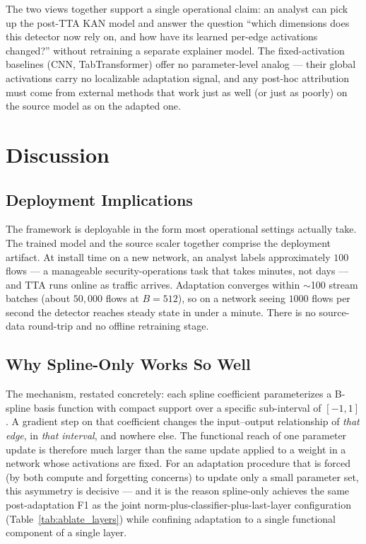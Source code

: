 \documentclass[10pt, conference, letterpaper]{IEEEtran}
\begin{document}
The two views together support a single operational claim: an analyst can pick up the post-TTA KAN model and answer the question ``which dimensions does this detector now rely on, and how have its learned per-edge activations changed?'' without retraining a separate explainer model. The fixed-activation baselines (CNN, TabTransformer) offer no parameter-level analog --- their global activations carry no localizable adaptation signal, and any post-hoc attribution must come from external methods that work just as well (or just as poorly) on the source model as on the adapted one.


\section{Discussion}
\label{sec:discussion}

\subsection{Deployment Implications}

The framework is deployable in the form most operational settings actually take. The trained model and the source scaler together comprise the deployment artifact. At install time on a new network, an analyst labels approximately $100$ flows --- a manageable security-operations task that takes minutes, not days --- and TTA runs online as traffic arrives. Adaptation converges within $\sim$100 stream batches (about $50{,}000$ flows at $B = 512$), so on a network seeing $1000$ flows per second the detector reaches steady state in under a minute. There is no source-data round-trip and no offline retraining stage.

\subsection{Why Spline-Only Works So Well}

The mechanism, restated concretely: each spline coefficient parameterizes a B-spline basis function with compact support over a specific sub-interval of $[-1, 1]$. A gradient step on that coefficient changes the input--output relationship of \emph{that edge}, in \emph{that interval}, and nowhere else. The functional reach of one parameter update is therefore much larger than the same update applied to a weight in a network whose activations are fixed. For an adaptation procedure that is forced (by both compute and forgetting concerns) to update only a small parameter set, this asymmetry is decisive --- and it is the reason spline-only achieves the same post-adaptation F1 as the joint norm-plus-classifier-plus-last-layer configuration (Table~\ref{tab:ablate_layers}) while confining adaptation to a single functional component of a single layer.
\end{document}
